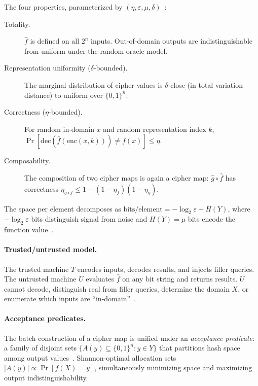 \documentclass[11pt]{article}
\theoremstyle{definition}
\theoremstyle{plain}
\theoremstyle{remark}
\newcommand{\fhat}{\hat{f}}
\newcommand{\ghat}{\hat{g}}
\newcommand{\enc}{\mathrm{enc}}
\newcommand{\dec}{\mathrm{dec}}
\newcommand{\B}{\{0,1\}}
\begin{document}
The four properties, parameterized by
$(\eta, \varepsilon, \mu, \delta)$~\cite[Sec.~4]{towell2026cipher}:

\begin{description}
\item[Totality.]  $\fhat$ is defined on all $2^n$ inputs.  Out-of-domain
  outputs are indistinguishable from uniform under the random oracle
  model.

\item[Representation uniformity ($\delta$-bounded).]  The marginal
  distribution of cipher values is $\delta$-close (in total variation
  distance) to uniform over $\B^n$.

\item[Correctness ($\eta$-bounded).]  For random in-domain $x$ and
  random representation index $k$,
  $\Pr[\dec(\fhat(\enc(x,k))) \neq f(x)] \leq \eta$.

\item[Composability.]  The composition of two cipher maps is again a
  cipher map: $\ghat \circ \fhat$ has correctness
  $\eta_{g \circ f} \leq 1 - (1 - \eta_f)(1 - \eta_g)$.
\end{description}

The space per element decomposes as
$\text{bits/element} = -\log_2 \varepsilon + H(Y)$, where
$-\log_2 \varepsilon$ bits distinguish signal from noise and
$H(Y) = \mu$ bits encode the function
value~\cite[Thm.~6.1]{towell2026cipher}.

\paragraph{Trusted/untrusted model.}
The trusted machine $T$ encodes inputs, decodes results, and injects
filler queries.  The untrusted machine $U$ evaluates $\fhat$ on any bit
string and returns results.  $U$ cannot decode, distinguish real from
filler queries, determine the domain $X$, or enumerate which inputs are
``in-domain''~\cite[Sec.~5]{towell2026cipher}.

\paragraph{Acceptance predicates.}
The batch construction of a cipher map is unified under an
\emph{acceptance predicate}: a family of disjoint sets
$\{A(y) \subseteq \B^n : y \in Y\}$ that partitions hash space among
output values~\cite[Sec.~6.2]{towell2026cipher}.  Shannon-optimal
allocation sets $|A(y)| \propto \Pr[f(X) = y]$, simultaneously
minimizing space and maximizing output indistinguishability.
\end{document}
